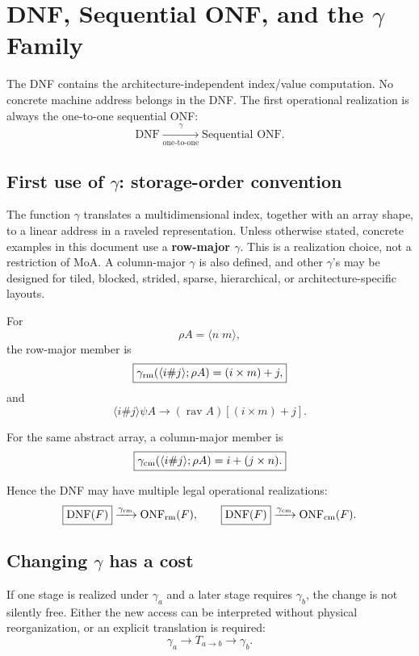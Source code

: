 \documentclass[11pt]{article}
\newcommand{\DNF}{\mathrm{DNF}}
\newcommand{\ONF}{\mathrm{ONF}}
\newcommand{\rav}{\operatorname{rav}}
\begin{document}
\section{DNF, Sequential ONF, and the \(\gamma\) Family}

The DNF contains the architecture-independent index/value computation.  No concrete machine
address belongs in the DNF.  The first operational realization is always the one-to-one sequential
ONF:
\[
\boxed{\DNF}
\xrightarrow[\text{one-to-one}]{\gamma}
\boxed{\text{Sequential ONF}}.
\]

\subsection{First use of \(\gamma\): storage-order convention}

The function \(\gamma\) translates a multidimensional index, together with an array shape, to a
linear address in a raveled representation.  Unless otherwise stated, concrete examples in this
document use a \textbf{row-major \(\gamma\)}.  This is a realization choice, not a restriction of
MoA.  A column-major \(\gamma\) is also defined, and other \(\gamma\)'s may be designed for tiled,
blocked, strided, sparse, hierarchical, or architecture-specific layouts.

For
\[
\rho A=\langle n\;m\rangle,
\]
the row-major member is
\[
\boxed{
\gamma_{\rm rm}(\langle i\#j\rangle;\rho A)
=
(i\times m)+j,
}
\]
and
\[
\boxed{
\langle i\#j\rangle\psi A
\longrightarrow
(\rav A)[(i\times m)+j].
}
\]

For the same abstract array, a column-major member is
\[
\boxed{
\gamma_{\rm cm}(\langle i\#j\rangle;\rho A)
=
i+(j\times n).
}
\]

Hence the DNF may have multiple legal operational realizations:
\[
\boxed{\DNF(F)}
\xrightarrow{\gamma_{\rm rm}}
\ONF_{\rm rm}(F),
\qquad
\boxed{\DNF(F)}
\xrightarrow{\gamma_{\rm cm}}
\ONF_{\rm cm}(F).
\]

\subsection{Changing \(\gamma\) has a cost}

If one stage is realized under \(\gamma_a\) and a later stage requires \(\gamma_b\), the change is
not silently free.  Either the new access can be interpreted without physical reorganization, or
an explicit translation is required:
\[
\boxed{
\gamma_a
\longrightarrow
T_{a\rightarrow b}
\longrightarrow
\gamma_b .
}
\]
\end{document}
